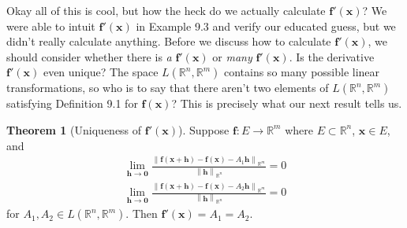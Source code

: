 \documentclass{article}
\newcommand{\R}{\mathbb{R}}
\newcommand{\x}{\mathbf{x}}
\newcommand{\f}{\mathbf{f}}
\newcommand{\ze}{\mathbf{0}}
\newcommand{\norm}[1]{\left\lVert#1\right\rVert}
\theoremstyle{definition}
\newtheorem{theorem}{Theorem}[section]
\begin{document}
	Okay all of this is cool, but how the heck do we actually calculate $ \f'(\x) $? We were able to intuit $ \f'(\x) $ in Example 9.3 and verify our educated guess, but we didn't really calculate anything. Before we discuss how to calculate $ \f'(\x) $, we should consider whether there is \textit{a} $ \f'(\x) $ or \textit{many} $ \f'(\x) $. Is the derivative $ \f'(\x) $ even unique? The space $ L(\R^n,\R^m) $ contains so many possible linear transformations, so who is to say that there aren't two elements of $ L(\R^n,\R^m) $ satisfying Definition 9.1 for $ \f(\x) $? This is precisely what our next result tells us. 
	\begin{theorem}[Uniqueness of $ \f'(\x) $]
		Suppose $ \f:E\to\R^m $ where $ E\subset \R^n $, $ \x \in E $, and \begin{align*}
			\lim\limits_{\mathbf h\to \ze}\frac{\norm{\f(\x+\mathbf h) - \f(\x)-A_1\mathbf{h}}_{\R^m}}{\norm{\mathbf h}_{\R^n}} = 0\\
			\lim\limits_{\mathbf h\to \ze}\frac{\norm{\f(\x+\mathbf h) - \f(\x)-A_2\mathbf{h}}_{\R^m}}{\norm{\mathbf h}_{\R^n}} = 0
		\end{align*}
		for $ A_1,A_2 \in L(\R^n,\R^m) $. Then $ \f'(\x) = A_1 = A_2 $. 
	\end{theorem}
\end{document}
